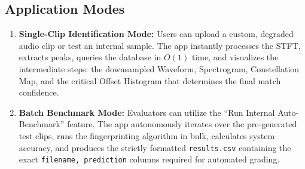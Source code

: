 \documentclass[12pt,a4paper]{article}
\begin{document}
\subsection{Application Modes}
\begin{enumerate}
    \item \textbf{Single-Clip Identification Mode:} Users can upload a custom, degraded audio clip or test an internal sample. The app instantly processes the STFT, extracts peaks, queries the database in $O(1)$ time, and visualizes the intermediate steps: the downsampled Waveform, Spectrogram, Constellation Map, and the critical Offset Histogram that determines the final match confidence.
    \item \textbf{Batch Benchmark Mode:} Evaluators can utilize the ``Run Internal Auto-Benchmark'' feature. The app autonomously iterates over the pre-generated test clips, runs the fingerprinting algorithm in bulk, calculates system accuracy, and produces the strictly formatted \texttt{results.csv} containing the exact \texttt{filename, prediction} columns required for automated grading.
\end{enumerate}
\end{document}

